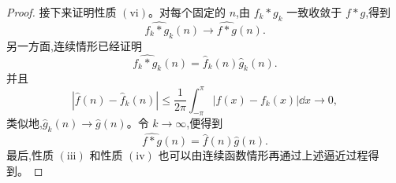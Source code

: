 \begin{proof}
	接下来证明性质 $\mathrm{(vi)}$。对每个固定的 $n$,由 $f_k\ast g_k$ 一致收敛于 $f\ast g$,得到
	\[
	\widehat{f_k\ast g_k}(n)\to\widehat{f\ast g}(n).
	\]
	另一方面,连续情形已经证明
	\[
	\widehat{f_k\ast g_k}(n)=\widehat f_k(n)\widehat g_k(n).
	\]
	并且
	\[
	|\widehat f(n)-\widehat f_k(n)|
	\leq \frac1{2\pi}\int_{-\pi}^{\pi}|f(x)-f_k(x)|\dd x\to0,
	\]
	类似地,$\widehat g_k(n)\to\widehat g(n)$。令 $k\to\infty$,便得到
	\[
	\widehat{f\ast g}(n)=\widehat f(n)\widehat g(n).
	\]
	最后,性质 $\mathrm{(iii)}$ 和性质 $\mathrm{(iv)}$ 也可以由连续函数情形再通过上述逼近过程得到。
\end{proof}

